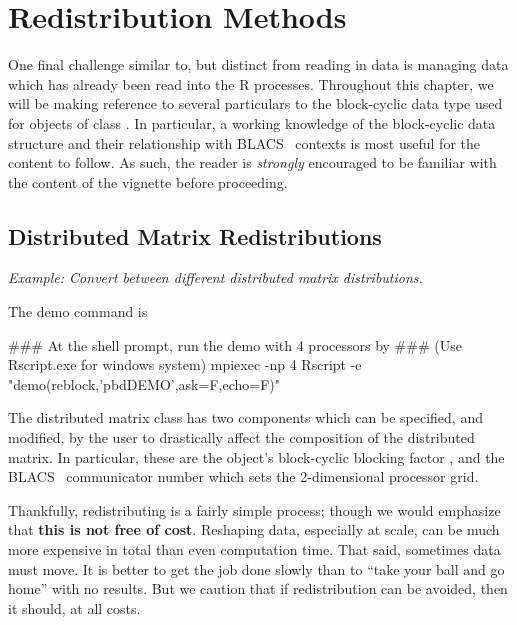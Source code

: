 \chapter{Redistribution Methods}
\label{sec:redist}

\vspace{0.5cm}


One final challenge similar to, but distinct from reading in data is managing data which has already been read into the R processes.  Throughout this chapter, we will be making reference to several particulars to the block-cyclic data type used for objects of
class .
In particular, a working knowledge of the block-cyclic data structure and their relationship with BLACS~ contexts is most useful for the content to follow.  As such, the reader is \emph{strongly} encouraged to be familiar with the content of the  vignette before proceeding.

\section{Distributed Matrix Redistributions}
\label{sec:dmatredist}

\emph{Example:  Convert between different distributed matrix distributions.}

The demo command is
\begin{Command}
### At the shell prompt, run the demo with 4 processors by
### (Use Rscript.exe for windows system)
mpiexec -np 4 Rscript -e "demo(reblock,'pbdDEMO',ask=F,echo=F)"
\end{Command}

The distributed matrix class 
has two components which can be specified, and modified, by the user to 
drastically affect the composition of the distributed matrix.  In particular, 
these are the object's block-cyclic blocking factor , and the 
BLACS~ communicator number  which sets the 
2-dimensional processor grid. 

Thankfully, redistributing is a fairly simple process; though we would emphasize 
that \textbf{this is not free of cost}.  Reshaping data, especially at scale, 
can be much more expensive in total than even computation time.  That said, 
sometimes data must move.  It is better to get the job done slowly than to 
``take your ball and go home'' with no results.  But we caution that if 
redistribution can be avoided, then it should, at all costs.

